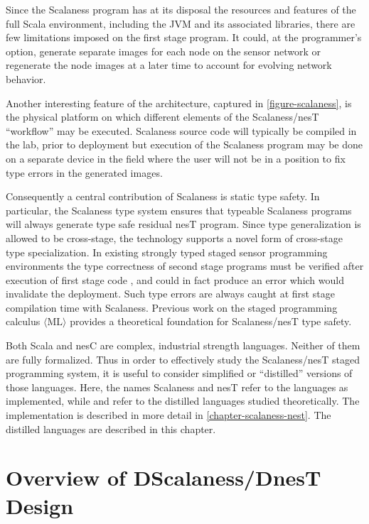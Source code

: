 Since the Scalaness program has at its disposal the resources and features of the full Scala
environment, including the JVM and its associated libraries, there are few limitations imposed
on the first stage program. It could, at the programmer's option, generate separate images for
each node on the sensor network or regenerate the node images at a later time to account for
evolving network behavior.

Another interesting feature of the architecture, captured in \autoref{figure-scalaness}, is the
physical platform on which different elements of the Scalaness/nesT ``workflow'' may be
executed. Scalaness source code will typically be compiled in the lab, prior to deployment but
execution of the Scalaness program may be done on a separate device in the field where the user
will not be in a position to fix type errors in the generated images.

Consequently a central contribution of Scalaness is static type safety. In particular, the
Scalaness type system ensures that typeable Scalaness programs will always generate type safe
residual nesT program. Since type generalization is allowed to be cross-stage, the technology
supports a novel form of cross-stage type specialization. In existing strongly typed staged
sensor programming environments the type correctness of second stage programs must be verified
after execution of first stage code \cite{Mainland-Flask-2008}, and could in fact produce an
error which would invalidate the deployment. Such type errors are always caught at first stage
compilation time with Scalaness. Previous work on the staged programming calculus $\langle
\text{ML} \rangle$ \cite{FramedML} provides a theoretical foundation for Scalaness/nesT type
safety.

Both Scala and nesC are complex, industrial strength languages. Neither of them are fully
formalized. Thus in order to effectively study the Scalaness/nesT staged programming system, it
is useful to consider simplified or ``distilled'' versions of those languages. Here, the
names Scalaness and nesT refer to the languages as implemented, while  and
 refer to the distilled languages studied theoretically. The implementation is
described in more detail in \autoref{chapter-scalaness-nest}. The distilled languages are
described in this chapter.

\section{Overview of DScalaness/DnesT Design}

